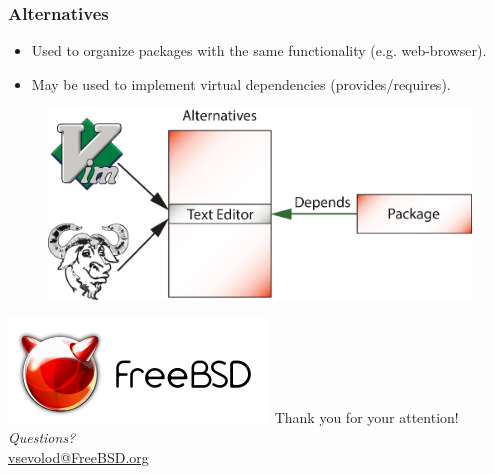 \documentclass{beamer}
\begin{document}
\begin{frame}
\frametitle{Alternatives}
\begin{itemize}
  \item Used to organize packages with the same functionality (e.g.
  web-browser).
  \item May be used to implement virtual dependencies (provides/requires).
\end{itemize}
\begin{figure}[h!]
  \centering
  \includegraphics[height=0.4\textheight]{q7.eps}
\end{figure}
\end{frame}

\begin{frame}
\begin{center}
\includegraphics{logo.pdf}
{\Large Thank you for your attention!} \\
\emph{Questions?} \\[4pt]
\url{vsevolod@FreeBSD.org}
\end{center}
\end{frame}
\end{document}
